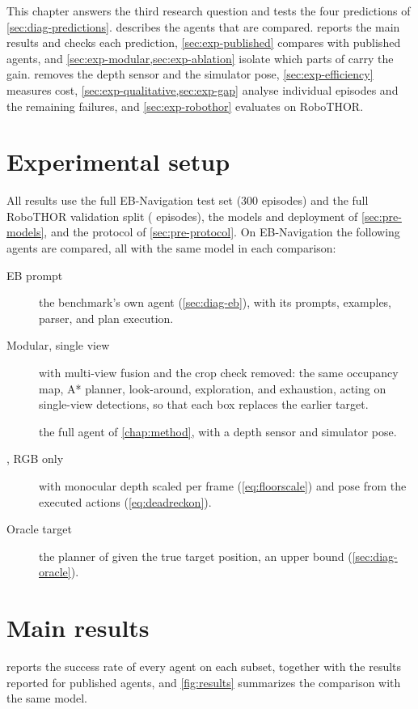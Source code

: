 \label{chap:experiments}
This chapter answers the third research question and tests the four predictions of \cref{sec:diag-predictions}.
 describes the agents that are compared.  reports the main results and checks
each prediction, \cref{sec:exp-published} compares \ours with published agents, and \cref{sec:exp-modular,sec:exp-ablation}
isolate which parts of \ours carry the gain.  removes the depth sensor and the simulator pose,
\cref{sec:exp-efficiency} measures cost, \cref{sec:exp-qualitative,sec:exp-gap} analyse individual episodes and the
remaining failures, and \cref{sec:exp-robothor} evaluates \ours on RoboTHOR.

\section{Experimental setup}
\label{sec:exp-setup}
All results use the full EB-Navigation test set (300 episodes) and the full RoboTHOR validation split (\nRoboN{}
episodes), the models and deployment of \cref{sec:pre-models}, and the protocol of \cref{sec:pre-protocol}. On
EB-Navigation the following agents are compared, all with the same model in each comparison:
\begin{description}
\item[EB prompt] the benchmark's own agent (\cref{sec:diag-eb}), with its prompts, examples, parser, and plan
execution.
\item[Modular, single view] \ours with multi-view fusion and the crop check removed: the same occupancy map, A*
planner, look-around, exploration, and exhaustion, acting on single-view detections, so that each box replaces the
earlier target.
\item[\ours] the full agent of \cref{chap:method}, with a depth sensor and simulator pose.
\item[\ours, RGB only] \ours with monocular depth scaled per frame (\cref{eq:floorscale}) and pose from the executed
actions (\cref{eq:deadreckon}).
\item[Oracle target] the planner of \ours given the true target position, an upper bound (\cref{sec:diag-oracle}).
\end{description}

\section{Main results}
\label{sec:exp-main}
 reports the success rate of every agent on each subset, together with the results reported for
published agents, and \cref{fig:results} summarizes the comparison with the same model.

